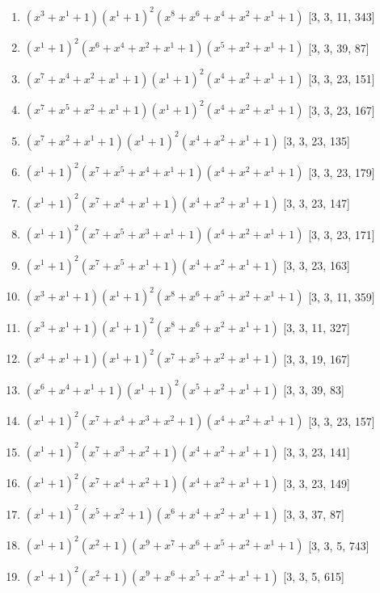 \documentclass[10pt,twocolumn]{article}
\begin{document}
\begin{enumerate}
\item $(x^{3} + x^{1} + 1)(x^{1} + 1)^{2}(x^{8} + x^{6} + x^{4} + x^{2} + x^{1} + 1)$  [3, 3, 11, 343]
\item $(x^{1} + 1)^{2}(x^{6} + x^{4} + x^{2} + x^{1} + 1)(x^{5} + x^{2} + x^{1} + 1)$  [3, 3, 39, 87]
\item $(x^{7} + x^{4} + x^{2} + x^{1} + 1)(x^{1} + 1)^{2}(x^{4} + x^{2} + x^{1} + 1)$  [3, 3, 23, 151]
\item $(x^{7} + x^{5} + x^{2} + x^{1} + 1)(x^{1} + 1)^{2}(x^{4} + x^{2} + x^{1} + 1)$  [3, 3, 23, 167]
\item $(x^{7} + x^{2} + x^{1} + 1)(x^{1} + 1)^{2}(x^{4} + x^{2} + x^{1} + 1)$  [3, 3, 23, 135]
\item $(x^{1} + 1)^{2}(x^{7} + x^{5} + x^{4} + x^{1} + 1)(x^{4} + x^{2} + x^{1} + 1)$  [3, 3, 23, 179]
\item $(x^{1} + 1)^{2}(x^{7} + x^{4} + x^{1} + 1)(x^{4} + x^{2} + x^{1} + 1)$  [3, 3, 23, 147]
\item $(x^{1} + 1)^{2}(x^{7} + x^{5} + x^{3} + x^{1} + 1)(x^{4} + x^{2} + x^{1} + 1)$  [3, 3, 23, 171]
\item $(x^{1} + 1)^{2}(x^{7} + x^{5} + x^{1} + 1)(x^{4} + x^{2} + x^{1} + 1)$  [3, 3, 23, 163]
\item $(x^{3} + x^{1} + 1)(x^{1} + 1)^{2}(x^{8} + x^{6} + x^{5} + x^{2} + x^{1} + 1)$  [3, 3, 11, 359]
\item $(x^{3} + x^{1} + 1)(x^{1} + 1)^{2}(x^{8} + x^{6} + x^{2} + x^{1} + 1)$  [3, 3, 11, 327]
\item $(x^{4} + x^{1} + 1)(x^{1} + 1)^{2}(x^{7} + x^{5} + x^{2} + x^{1} + 1)$  [3, 3, 19, 167]
\item $(x^{6} + x^{4} + x^{1} + 1)(x^{1} + 1)^{2}(x^{5} + x^{2} + x^{1} + 1)$  [3, 3, 39, 83]
\item $(x^{1} + 1)^{2}(x^{7} + x^{4} + x^{3} + x^{2} + 1)(x^{4} + x^{2} + x^{1} + 1)$  [3, 3, 23, 157]
\item $(x^{1} + 1)^{2}(x^{7} + x^{3} + x^{2} + 1)(x^{4} + x^{2} + x^{1} + 1)$  [3, 3, 23, 141]
\item $(x^{1} + 1)^{2}(x^{7} + x^{4} + x^{2} + 1)(x^{4} + x^{2} + x^{1} + 1)$  [3, 3, 23, 149]
\item $(x^{1} + 1)^{2}(x^{5} + x^{2} + 1)(x^{6} + x^{4} + x^{2} + x^{1} + 1)$  [3, 3, 37, 87]
\item $(x^{1} + 1)^{2}(x^{2} + 1)(x^{9} + x^{7} + x^{6} + x^{5} + x^{2} + x^{1} + 1)$  [3, 3, 5, 743]
\item $(x^{1} + 1)^{2}(x^{2} + 1)(x^{9} + x^{6} + x^{5} + x^{2} + x^{1} + 1)$  [3, 3, 5, 615]

\end{enumerate}
\end{document}
